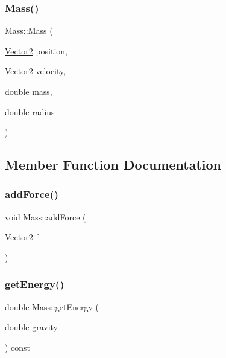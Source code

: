 \subsubsection{\texorpdfstring{Mass()}{Mass()}\hspace{0.1cm}{\footnotesize\ttfamily [2/2]}}
{\footnotesize\ttfamily Mass\+::\+Mass (\begin{DoxyParamCaption}\item[{\hyperlink{classVector2}{Vector2}}]{position,  }\item[{\hyperlink{classVector2}{Vector2}}]{velocity,  }\item[{double}]{mass,  }\item[{double}]{radius }\end{DoxyParamCaption})}



\subsection{Member Function Documentation}
\mbox{\label{classMass_aa4c034fd024e5ef2c81b4f9b5ff4ca7a}} 
\subsubsection{\texorpdfstring{add\+Force()}{addForce()}}
{\footnotesize\ttfamily void Mass\+::add\+Force (\begin{DoxyParamCaption}\item[{\hyperlink{classVector2}{Vector2}}]{f }\end{DoxyParamCaption})}

\mbox{\label{classMass_a5296c919bc09faea8152b8d40c66f92f}} 
\subsubsection{\texorpdfstring{get\+Energy()}{getEnergy()}}
{\footnotesize\ttfamily double Mass\+::get\+Energy (\begin{DoxyParamCaption}\item[{double}]{gravity }\end{DoxyParamCaption}) const}

\mbox{\label{classMass_a41b3a36c1f242dd8a7018693de3a59bb}} 
